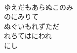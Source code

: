 \documentclass[10pt,b5j]{tarticle} %
\begin{document}
\begin{enumerate}
\begin{minipage}[c]{\blocksize}
    \end{minipage}
    \begin{minipage}[c]{\blocksize}
        
        \vspace{\linespace}
        \item~\\
        ゆえだもあらぬこのみ\\
        のにみりて\\
        ぬぐいもれずただ\\
        れちてはにわれ\\
        にし
    
    \end{minipage}
\end{enumerate} %
\end{document}
